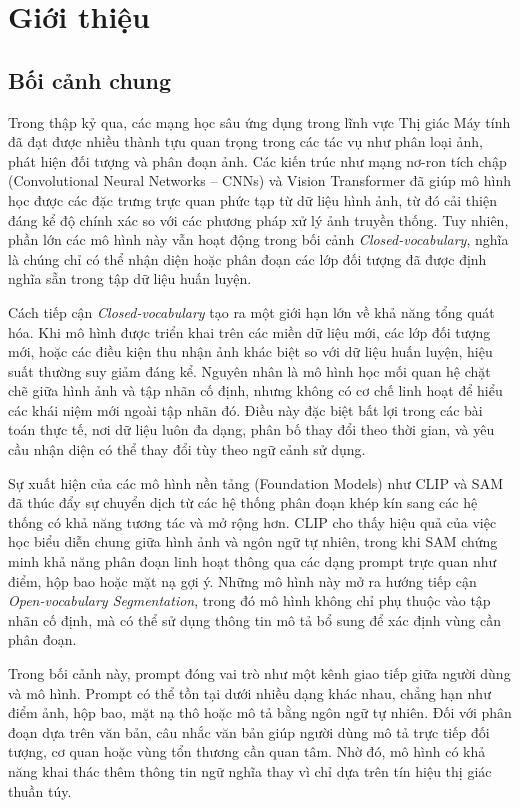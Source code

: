 \chapter{Giới thiệu}
\label{Chapter1}
\setcounter{secnumdepth}{5}

\section{Bối cảnh chung}
    Trong thập kỷ qua, các mạng học sâu ứng dụng trong lĩnh vực Thị giác Máy tính đã đạt được nhiều thành tựu quan trọng trong các tác vụ như phân loại ảnh, phát hiện đối tượng và phân đoạn ảnh. Các kiến trúc như mạng nơ-ron tích chập (Convolutional Neural Networks -- CNNs) và Vision Transformer đã giúp mô hình học được các đặc trưng trực quan phức tạp từ dữ liệu hình ảnh, từ đó cải thiện đáng kể độ chính xác so với các phương pháp xử lý ảnh truyền thống. Tuy nhiên, phần lớn các mô hình này vẫn hoạt động trong bối cảnh \textit{Closed-vocabulary}, nghĩa là chúng chỉ có thể nhận diện hoặc phân đoạn các lớp đối tượng đã được định nghĩa sẵn trong tập dữ liệu huấn luyện.

    Cách tiếp cận \textit{Closed-vocabulary} tạo ra một giới hạn lớn về khả năng tổng quát hóa. Khi mô hình được triển khai trên các miền dữ liệu mới, các lớp đối tượng mới, hoặc các điều kiện thu nhận ảnh khác biệt so với dữ liệu huấn luyện, hiệu suất thường suy giảm đáng kể. Nguyên nhân là mô hình học mối quan hệ chặt chẽ giữa hình ảnh và tập nhãn cố định, nhưng không có cơ chế linh hoạt để hiểu các khái niệm mới ngoài tập nhãn đó. Điều này đặc biệt bất lợi trong các bài toán thực tế, nơi dữ liệu luôn đa dạng, phân bố thay đổi theo thời gian, và yêu cầu nhận diện có thể thay đổi tùy theo ngữ cảnh sử dụng.

    Sự xuất hiện của các mô hình nền tảng (Foundation Models) như CLIP và SAM đã thúc đẩy sự chuyển dịch từ các hệ thống phân đoạn khép kín sang các hệ thống có khả năng tương tác và mở rộng hơn. CLIP cho thấy hiệu quả của việc học biểu diễn chung giữa hình ảnh và ngôn ngữ tự nhiên, trong khi SAM chứng minh khả năng phân đoạn linh hoạt thông qua các dạng prompt trực quan như điểm, hộp bao hoặc mặt nạ gợi ý. Những mô hình này mở ra hướng tiếp cận \textit{Open-vocabulary Segmentation}, trong đó mô hình không chỉ phụ thuộc vào tập nhãn cố định, mà có thể sử dụng thông tin mô tả bổ sung để xác định vùng cần phân đoạn.

    Trong bối cảnh này, prompt đóng vai trò như một kênh giao tiếp giữa người dùng và mô hình. Prompt có thể tồn tại dưới nhiều dạng khác nhau, chẳng hạn như điểm ảnh, hộp bao, mặt nạ thô hoặc mô tả bằng ngôn ngữ tự nhiên. Đối với phân đoạn dựa trên văn bản, câu nhắc văn bản giúp người dùng mô tả trực tiếp đối tượng, cơ quan hoặc vùng tổn thương cần quan tâm. Nhờ đó, mô hình có khả năng khai thác thêm thông tin ngữ nghĩa thay vì chỉ dựa trên tín hiệu thị giác thuần túy.

